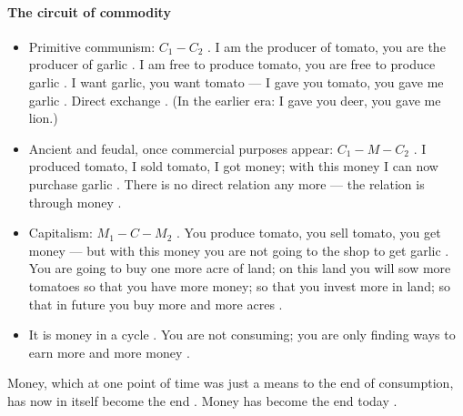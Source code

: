 \paragraph{The circuit of commodity}
\begin{itemize}
    \item Primitive communism: $C_1 - C_2$ . I am the producer of tomato, you are the producer of garlic . I am free to produce tomato, you are free to produce garlic . I want garlic, you want tomato --- I gave you tomato, you gave me garlic . Direct exchange . (In the earlier era: I gave you deer, you gave me lion.) 
    \item Ancient and feudal, once commercial purposes appear: $C_1 - M - C_2$ . I produced tomato, I sold tomato, I got money; with this money I can now purchase garlic . There is no direct relation any more --- the relation is through money .
    \item Capitalism: $M_1 - C - M_2$ . You produce tomato, you sell tomato, you get money --- but with this money you are not going to the shop to get garlic . You are going to buy one more acre of land; on this land you will sow more tomatoes so that you have more money; so that you invest more in land; so that in future you buy more and more acres .
    \item It is money in a cycle . You are not consuming; you are only finding ways to earn more and more money .
\end{itemize}

\begin{KeyConcept}
Money, which at one point of time was just a means to the end of consumption, has now in itself become the end . Money has become the end today .
\end{KeyConcept}

